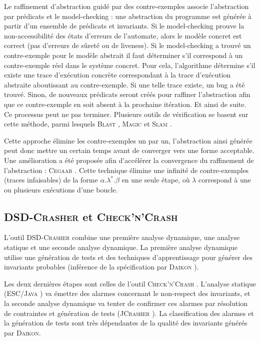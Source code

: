 \documentclass[french]{spimufcphdthesis}
\begin{document}
Le raffinement d'abstraction guidé par des contre-exemples \cite{CEGAR} associe
l’abstraction par prédicats et le model-checking : une abstraction du programme
est générée à partir d’un ensemble de prédicats et invariants. Si le
model-checking prouve la non-accessibilité des états d'erreurs de l'automate,
alors le modèle concret est correct (pas d'erreurs de sûreté ou de liveness).
Si le model-checking a trouvé un contre-exemple pour le modèle abstrait il faut
déterminer s'il correspond à un contre-exemple réel dans le système concret.
Pour cela, l'algorithme détermine s'il existe une trace d'exécution concrète
correspondant à la trace d'exécution abstraite aboutissant au contre-exemple.
Si une telle trace existe, un bug a été trouvé. Sinon, de nouveaux prédicats
seront créés pour raffiner l'abstraction afin que ce contre-exemple en soit
absent à la prochaine itération. Et ainsi de suite. Ce processus peut ne pas
terminer. Plusieurs outils de vérification se basent sur cette méthode, parmi
lesquels \textsc{Blast} \cite{BLAST}, \textsc{Magic} \cite{MAGIC} et
\textsc{Slam} \cite{SLAM}.

Cette approche élimine les contre-exemples un par un, l'abstraction ainsi
générée peut donc mettre un certain temps avant de converger vers une forme
acceptable. Une amélioration a été proposée afin d'accélérer la convergence du
raffinement de l'abstraction : \textsc{Cegaar} \cite{CEGAAR}. Cette technique
élimine une infinité de contre-exemples (traces infaisables) de la forme
$\alpha . \lambda^* . \beta$ en une seule étape, où $\lambda$ correspond à une
ou plusieurs exécutions d'une boucle.

\subsection{\textsc{DSD-Crasher} et \textsc{Check'n'Crash}}

L'outil \textsc{DSD-Crasher} \cite{DSD-Crasher} combine une première analyse
dynamique, une analyse statique et une seconde analyse dynamique. La première
analyse dynamique utilise une génération de tests et des techniques
d'apprentissage pour générer des invariants probables (inférence de la
spécification par \textsc{Daikon} \cite{discover-invariants}).

Les deux dernières étapes sont celles de l'outil \textsc{Check'n'Crash}
\cite{ChecknCrash}. L'analyse statique (\textsc{ESC/Java} \cite{ESC/Java}) va
émettre des alarmes concernant le non-respect des invariants, et la seconde
analyse dynamique va tenter de confirmer ces alarmes par résolution de
contraintes et génération de tests (\textsc{JCrasher} \cite{JCrasher}). La
classification des alarmes et la génération de tests sont très dépendantes de
la qualité des invariants générés par \textsc{Daikon}.
\end{document}
